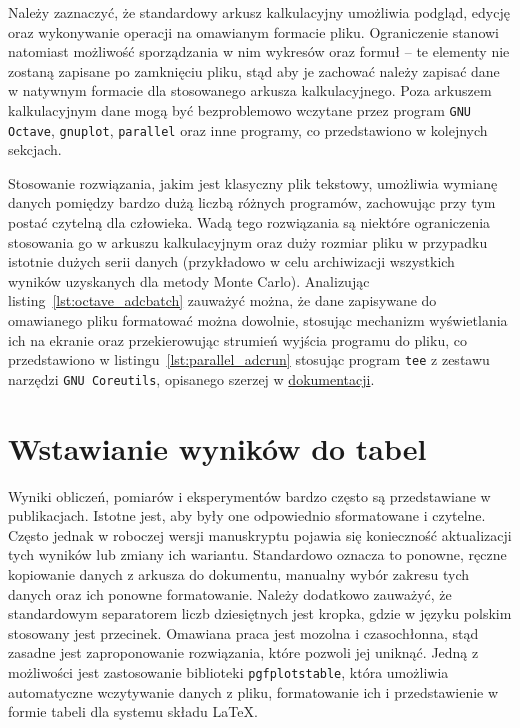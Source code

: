 Należy zaznaczyć, że standardowy arkusz kalkulacyjny umożliwia podgląd, edycję oraz wykonywanie operacji na omawianym formacie pliku. Ograniczenie stanowi natomiast możliwość sporządzania w nim wykresów oraz formuł -- te elementy nie zostaną zapisane po zamknięciu pliku, stąd aby je zachować należy zapisać dane w natywnym formacie dla stosowanego arkusza kalkulacyjnego. Poza arkuszem kalkulacyjnym dane mogą być bezproblemowo wczytane przez program \texttt{GNU Octave}, \texttt{gnuplot}, \texttt{parallel} oraz inne programy, co przedstawiono w kolejnych sekcjach.

Stosowanie rozwiązania, jakim jest klasyczny plik tekstowy, umożliwia wymianę danych pomiędzy bardzo dużą liczbą różnych programów, zachowując przy tym postać czytelną dla człowieka. Wadą tego rozwiązania są niektóre ograniczenia stosowania go w arkuszu kalkulacyjnym oraz duży rozmiar pliku w przypadku istotnie dużych serii danych (przykładowo w celu archiwizacji wszystkich wyników uzyskanych dla metody Monte Carlo). Analizując listing~\ref{lst:octave_adcbatch} zauważyć można, że dane zapisywane do omawianego pliku formatować można dowolnie, stosując mechanizm wyświetlania ich na ekranie oraz przekierowując strumień wyjścia programu do pliku, co przedstawiono w listingu~\ref{lst:parallel_adcrun} stosując program \texttt{tee} z zestawu narzędzi \texttt{GNU Coreutils}, opisanego szerzej w \href{https://www.gnu.org/software/coreutils/manual}{dokumentacji}.

\section{Wstawianie wyników do tabel}

Wyniki obliczeń, pomiarów i eksperymentów bardzo często są przedstawiane w publikacjach. Istotne jest, aby były one odpowiednio sformatowane i czytelne. Często jednak w roboczej wersji manuskryptu pojawia się konieczność aktualizacji tych wyników lub zmiany ich wariantu. Standardowo oznacza to ponowne, ręczne kopiowanie danych z arkusza do dokumentu, manualny wybór zakresu tych danych oraz ich ponowne formatowanie. Należy dodatkowo zauważyć, że standardowym separatorem liczb dziesiętnych jest kropka, gdzie w języku polskim stosowany jest przecinek. Omawiana praca jest mozolna i czasochłonna, stąd zasadne jest zaproponowanie rozwiązania, które pozwoli jej uniknąć. Jedną z możliwości jest zastosowanie biblioteki \texttt{pgfplotstable}, która umożliwia automatyczne wczytywanie danych z pliku, formatowanie ich i przedstawienie w formie tabeli dla systemu składu \LaTeX{}.

